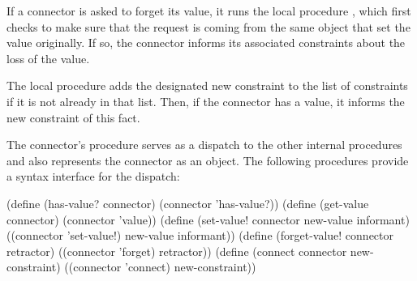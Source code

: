 \noindent
If a connector is asked to forget its value, it runs the local procedure
, which first checks to make sure that the request is
coming from the same object that set the value originally.  If so, the
connector informs its associated constraints about the loss of the value.

The local procedure  adds the designated new constraint to the
list of constraints if it is not already in that list.  Then, if the connector
has a value, it informs the new constraint of this fact.

The connector's procedure  serves as a dispatch to the other internal
procedures and also represents the connector as an object.  The following
procedures provide a syntax interface for the dispatch:

\begin{codeBlock}
(define (has-value? connector)
  (connector 'has-value?))
(define (get-value connector)
  (connector 'value))
(define (set-value! connector new-value informant)
  ((connector 'set-value!) new-value informant))
(define (forget-value! connector retractor)
  ((connector 'forget) retractor))
(define (connect connector new-constraint)
  ((connector 'connect) new-constraint))
\end{codeBlock}

